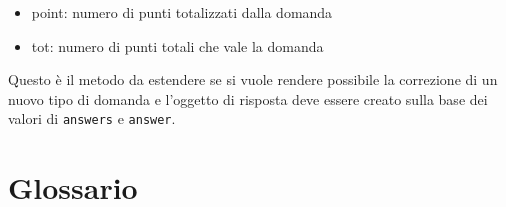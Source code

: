 \documentclass[12pt,a4paper]{article}
\begin{document}
\begin{itemize}
	\begin{itemize}
	\item point: numero di punti totalizzati dalla domanda
	\item tot: numero di punti totali che vale la domanda
	\end{itemize}
	Questo è il metodo da estendere se si vuole rendere possibile la correzione di un nuovo tipo di domanda e l’oggetto di risposta deve essere creato sulla base dei valori di \texttt{answers} e \texttt{answer}.
	\end{itemize}

	\newpage
	\section{Glossario}
\end{document}
